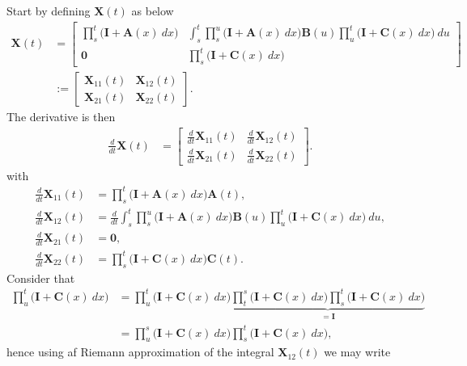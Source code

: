 \documentclass[
]{book}
\begin{document}
Start by defining \(\mathbf{X}(t)\) as below
\begin{align*}
\mathbf{X}(t)&=
\begin{bmatrix}
\prod_{s}^t\big(\mathbf{I}+\mathbf{A}(x)\ dx\big) & \int_s^t\prod_{s}^u\big(\mathbf{I}+\mathbf{A}(x)\ dx\big)\mathbf{B}(u)\prod_{u}^t\big(\mathbf{I}+\mathbf{C}(x)\ dx\big)\ du\\
\mathbf{0} & \prod_{s}^t\big(\mathbf{I}+\mathbf{C}(x)\ dx\big)
\end{bmatrix}\\
&:=\begin{bmatrix}
\mathbf{X}_{11}(t) & \mathbf{X}_{12}(t)\\
\mathbf{X}_{21}(t) & \mathbf{X}_{22}(t)
\end{bmatrix}.
\end{align*}
The derivative is then
\begin{align*}
\frac{d}{dt}\mathbf{X}(t)&=
\begin{bmatrix}
\frac{d}{dt}\mathbf{X}_{11}(t) & \frac{d}{dt}\mathbf{X}_{12}(t)\\
\frac{d}{dt}\mathbf{X}_{21}(t) & \frac{d}{dt}\mathbf{X}_{22}(t)
\end{bmatrix}.
\end{align*}
with
\begin{align*}
\frac{d}{dt}\mathbf{X}_{11}(t)&=\prod_{s}^t\big(\mathbf{I}+\mathbf{A}(x)\ dx\big)\mathbf{A}(t),\\
\frac{d}{dt}\mathbf{X}_{12}(t)&= \frac{d}{dt}\int_s^t\prod_{s}^u\big(\mathbf{I}+\mathbf{A}(x)\ dx\big)\mathbf{B}(u)\prod_{u}^t\big(\mathbf{I}+\mathbf{C}(x)\ dx\big)\ du,\\
\frac{d}{dt}\mathbf{X}_{21}(t)&=\mathbf{0},\\
\frac{d}{dt}\mathbf{X}_{22}(t)&=\prod_{s}^t\big(\mathbf{I}+\mathbf{C}(x)\ dx\big)\mathbf{C}(t).
\end{align*}
Consider that
\begin{align*}
\prod_{u}^t\big(\mathbf{I}+\mathbf{C}(x)\ dx\big)&=\prod_{u}^t\big(\mathbf{I}+\mathbf{C}(x)\ dx\big)\underbrace{\prod_{t}^s\big(\mathbf{I}+\mathbf{C}(x)\ dx\big)\prod_{s}^t\big(\mathbf{I}+\mathbf{C}(x)\ dx\big)}_{=\mathbf{I}}\\
&=\prod_{u}^s\big(\mathbf{I}+\mathbf{C}(x)\ dx\big)\prod_{s}^t\big(\mathbf{I}+\mathbf{C}(x)\ dx\big),
\end{align*}
hence using af Riemann approximation of the integral \(\mathbf{X}_{12}(t)\) we may write
\end{document}

